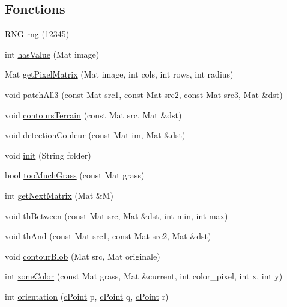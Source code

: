 \subsection*{Fonctions}
\begin{DoxyCompactItemize}
\item 
R\+NG \hyperlink{video-player_8cpp_a2bb3a617236eb1bd8ace5e140f519081}{rng} (12345)
\item 
int \hyperlink{video-player_8cpp_a7d45bd8cb5867588c53db90cd9f2a384}{has\+Value} (Mat image)
\item 
Mat \hyperlink{video-player_8cpp_aed04ba0c6cd8101c6a0fbfbb01f7f212}{get\+Pixel\+Matrix} (Mat image, int cols, int rows, int radius)
\item 
void \hyperlink{video-player_8cpp_a9f80ae7e85756c477e38dea2fecc278d}{patch\+All3} (const Mat src1, const Mat src2, const Mat src3, Mat \&dst)
\item 
void \hyperlink{video-player_8cpp_ab27159545e19dba751b0be11450164be}{contours\+Terrain} (const Mat src, Mat \&dst)
\item 
void \hyperlink{video-player_8cpp_a5c9426cb28038e89622652e1698e9ea2}{detection\+Couleur} (const Mat im, Mat \&dst)
\item 
void \hyperlink{video-player_8cpp_af2babdeaf66dfac24e508efa01c230a0}{init} (String folder)
\item 
bool \hyperlink{video-player_8cpp_ae6327342609d01a59423d2f231d83921}{too\+Much\+Grass} (const Mat grass)
\item 
int \hyperlink{video-player_8cpp_ae51308a281a1e8f6a879b4ff926df8cc}{get\+Next\+Matrix} (Mat \&M)
\item 
void \hyperlink{video-player_8cpp_afa34257303624cc2e2f9e6b70d3afffc}{th\+Between} (const Mat src, Mat \&dst, int min, int max)
\item 
void \hyperlink{video-player_8cpp_ac6245a17f42345fb5aa5a31b79fa3018}{th\+And} (const Mat src1, const Mat src2, Mat \&dst)
\item 
void \hyperlink{video-player_8cpp_add22166c90cbb599c9d4ed5bb260e43a}{contour\+Blob} (Mat src, Mat originale)
\item 
int \hyperlink{video-player_8cpp_ac89fd49fa60c43491222d0a4f4e0770b}{zone\+Color} (const Mat grass, Mat \&current, int color\+\_\+pixel, int x, int y)
\item 
int \hyperlink{video-player_8cpp_a830b96aaafe70cecf099c535278f5e15}{orientation} (\hyperlink{structcPoint}{c\+Point} p, \hyperlink{structcPoint}{c\+Point} q, \hyperlink{structcPoint}{c\+Point} r)
\item 

\end{DoxyCompactItemize}
